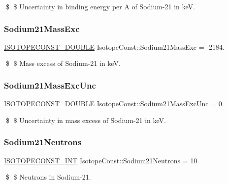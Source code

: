 \$ \$ Uncertainty in binding energy per A of Sodium-\/21 in keV. \mbox{\label{group___isotope_const-_sodium-_na21_ga22d7d0fac9be3d290f2e2b07324338a3}} 
\subsubsection{\texorpdfstring{Sodium21\+Mass\+Exc}{Sodium21MassExc}}
{\footnotesize\ttfamily \mbox{\hyperlink{group___isotope_const-_macros_ga8f45a7272ce02c0b4c65c44636ed719a}{I\+S\+O\+T\+O\+P\+E\+C\+O\+N\+S\+T\+\_\+\+D\+O\+U\+B\+LE}} Isotope\+Const\+::\+Sodium21\+Mass\+Exc = -\/2184.}

\$ \$ Mass excess of Sodium-\/21 in keV. \mbox{\label{group___isotope_const-_sodium-_na21_ga6cafd20bff09fcb91f419a76ab24cabd}} 
\subsubsection{\texorpdfstring{Sodium21\+Mass\+Exc\+Unc}{Sodium21MassExcUnc}}
{\footnotesize\ttfamily \mbox{\hyperlink{group___isotope_const-_macros_ga8f45a7272ce02c0b4c65c44636ed719a}{I\+S\+O\+T\+O\+P\+E\+C\+O\+N\+S\+T\+\_\+\+D\+O\+U\+B\+LE}} Isotope\+Const\+::\+Sodium21\+Mass\+Exc\+Unc = 0.}

\$ \$ Uncertainty in mass excess of Sodium-\/21 in keV. \mbox{\label{group___isotope_const-_sodium-_na21_ga28e36fc8cb64c7b01b6ee10211ea2543}} 
\subsubsection{\texorpdfstring{Sodium21\+Neutrons}{Sodium21Neutrons}}
{\footnotesize\ttfamily \mbox{\hyperlink{group___isotope_const-_macros_ga5f18360b3e99483a35c32d789e62621c}{I\+S\+O\+T\+O\+P\+E\+C\+O\+N\+S\+T\+\_\+\+I\+NT}} Isotope\+Const\+::\+Sodium21\+Neutrons = 10}

\$ \$ Neutrons in Sodium-\/21. \mbox{\label{group___isotope_const-_sodium-_na21_gadd63f95d33df7cb7203ee3c8802ffe6d}} 
